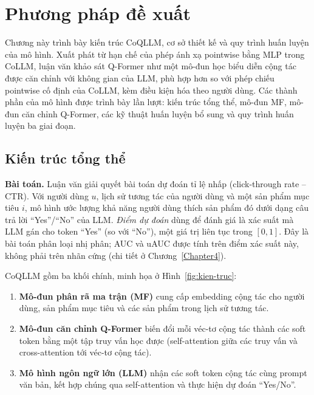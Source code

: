 \chapter{Phương pháp đề xuất}
\label{Chapter3}

Chương này trình bày kiến trúc CoQLLM, cơ sở thiết kế và quy trình huấn luyện của mô hình.
Xuất phát từ hạn chế của phép ánh xạ pointwise bằng MLP trong CoLLM, luận văn khảo sát
Q-Former như một mô-đun học biểu diễn cộng tác được căn chỉnh với không gian của LLM, phù hợp hơn so với phép chiếu pointwise cố định của CoLLM, kèm điều kiện hóa theo người dùng. Các thành phần của mô hình được trình bày lần lượt:
kiến trúc tổng thể, mô-đun MF, mô-đun căn chỉnh Q-Former, các kỹ thuật huấn luyện bổ sung và quy trình
huấn luyện ba giai đoạn.

\section{Kiến trúc tổng thể}
\label{sec:kien-truc-tong-quan}

\textbf{Bài toán.} Luận văn giải quyết bài toán dự đoán tỉ lệ nhấp (click-through rate -- CTR).
Với người dùng
$u$, lịch sử tương tác của người dùng và một sản phẩm mục tiêu $i$, mô hình ước lượng khả
năng người dùng thích sản phẩm đó dưới dạng câu trả lời ``Yes''/``No'' của LLM.
\textit{Điểm dự đoán} dùng để đánh giá là xác suất mà LLM gán cho token ``Yes'' (so với
``No''), một giá trị liên tục trong $[0,1]$. Đây là bài toán phân loại nhị phân; AUC và uAUC
được tính trên điểm xác suất này, không phải trên nhãn cứng (chi tiết ở
Chương~\ref{Chapter4}).

CoQLLM gồm ba khối chính, minh họa ở Hình~\ref{fig:kien-truc}:

\begin{enumerate}
    \item \textbf{Mô-đun phân rã ma trận (MF)} cung cấp embedding cộng tác cho người dùng,
    sản phẩm mục tiêu và các sản phẩm trong lịch sử tương tác.

    \item \textbf{Mô-đun căn chỉnh Q-Former} biến đổi mỗi véc-tơ cộng tác thành các soft token bằng một
    tập truy vấn học được (self-attention giữa các truy vấn và cross-attention tới véc-tơ cộng
    tác).

    \item \textbf{Mô hình ngôn ngữ lớn (LLM)} nhận các soft token cộng tác cùng prompt văn
    bản, kết hợp chúng qua self-attention và thực hiện dự đoán ``Yes/No''.
\end{enumerate}

